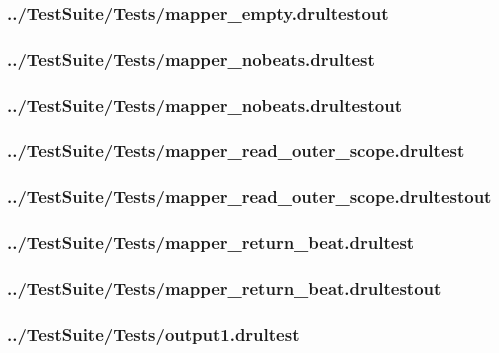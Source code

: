 \begin{changemargin}{-1in}{-1in}
\subsubsection{../TestSuite/Tests/mapper\_empty.drultestout}


\subsubsection{../TestSuite/Tests/mapper\_nobeats.drultest}


\subsubsection{../TestSuite/Tests/mapper\_nobeats.drultestout}


\subsubsection{../TestSuite/Tests/mapper\_read\_outer\_scope.drultest}


\subsubsection{../TestSuite/Tests/mapper\_read\_outer\_scope.drultestout}


\subsubsection{../TestSuite/Tests/mapper\_return\_beat.drultest}


\subsubsection{../TestSuite/Tests/mapper\_return\_beat.drultestout}


\subsubsection{../TestSuite/Tests/output1.drultest}



\end{changemargin}
